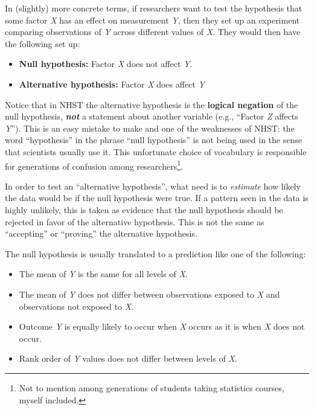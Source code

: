 \documentclass[
  13,
  letterpaper,
]{report}
\begin{document}
In (slightly) more concrete terms, if researchers want to test the
hypothesis that some factor \emph{X} has an effect on measurement
\emph{Y}, then they set up an experiment comparing observations of
\emph{Y} across different values of \emph{X}. They would then have the
following set up:

\begin{itemize}
\item
  \textbf{Null hypothesis:} Factor \emph{X} does not affect \emph{Y}.
\item
  \textbf{Alternative hypothesis:} Factor \emph{X} does affect \emph{Y}
\end{itemize}

Notice that in NHST the alternative hypothesis is the \textbf{logical
negation} of the null hypothesis, \textbf{\emph{not}} a statement about
another variable (e.g., ``Factor \emph{Z} affects \emph{Y}''). This is
an easy mistake to make and one of the weaknesses of NHST: the word
``hypothesis'' in the phrase ``null hypothesis'' is not being used in
the sense that scientists usually use it. This unfortunate choice of
vocabulary is responsible for generations of confusion among
researchers\footnote{Not to mention among generations of students taking
  statistics courses, myself included.}.

In order to test an ``alternative hypothesis'', what need is to
\emph{estimate} how likely the data would be if the null hypothesis were
true. If a pattern seen in the data is highly unlikely, this is taken as
evidence that the null hypothesis should be rejected in favor of the
alternative hypothesis. This is not the same as ``accepting'' or
``proving'' the alternative hypothesis.

The null hypothesis is usually translated to a prediction like one of
the following:

\begin{itemize}
\item
  The mean of \emph{Y} is the same for all levels of \emph{X}.
\item
  The mean of \emph{Y} does not differ between observations exposed to
  \emph{X} and observations not exposed to \emph{X}.
\item
  Outcome \emph{Y} is equally likely to occur when \emph{X} occurs as it
  is when \emph{X} does not occur.
\item
  Rank order of \emph{Y} values does not differ between levels of
  \emph{X}.
\end{itemize}
\end{document}
